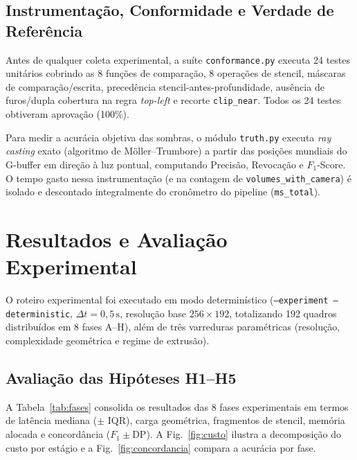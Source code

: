 \documentclass[conference]{IEEEtran}
\begin{document}
\subsection{Instrumentação, Conformidade e Verdade de Referência}

Antes de qualquer coleta experimental, a suíte \texttt{conformance.py} executa 24 testes unitários cobrindo as 8 funções de comparação, 8 operações de stencil, máscaras de comparação/escrita, precedência stencil-antes-profundidade, ausência de furos/dupla cobertura na regra \textit{top-left} e recorte \texttt{clip\_near}. Todos os 24 testes obtiveram aprovação (100\%).

Para medir a acurácia objetiva das sombras, o módulo \texttt{truth.py} executa \textit{ray casting} exato (algoritmo de Möller--Trumbore) a partir das posições mundiais do G-buffer em direção à luz pontual, computando Precisão, Revocação e $F_1$-Score. O tempo gasto nessa instrumentação (e na contagem de \texttt{volumes\_with\_camera}) é isolado e descontado integralmente do cronômetro do pipeline (\texttt{ms\_total}).

\section{Resultados e Avaliação Experimental}

O roteiro experimental foi executado em modo determinístico (\texttt{--experiment --deterministic}, $\Delta t = 0{,}5\,\text{s}$, resolução base $256\times 192$, totalizando 192 quadros distribuídos em 8 fases A--H), além de três varreduras paramétricas (resolução, complexidade geométrica e regime de extrusão).

\subsection{Avaliação das Hipóteses H1--H5}

A Tabela~\ref{tab:fases} consolida os resultados das 8 fases experimentais em termos de latência mediana ($\pm$ IQR), carga geométrica, fragmentos de stencil, memória alocada e concordância ($F_1 \pm \text{DP}$). A Fig.~\ref{fig:custo} ilustra a decomposição do custo por estágio e a Fig.~\ref{fig:concordancia} compara a acurácia por fase.
\end{document}
